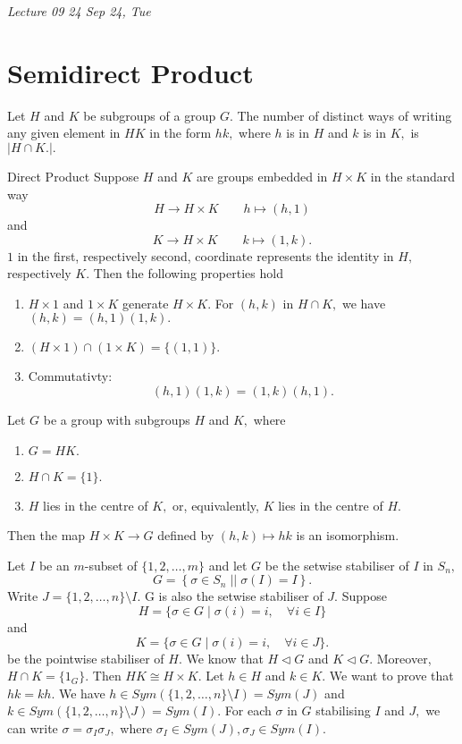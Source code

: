 \noindent
\emph{Lecture 09 \hfill 24 Sep 24, Tue}
\section{Semidirect Product}

\begin{proposition}\label{prop:number-of-representations}
	Let $H$ and $K$ be subgroups of a group $G.$ The number of distinct ways of
	writing any given element in $HK$ in the form $hk,$ where $h$ is in $H$ and $k$ 
	is in $K,$ is $ \lvert H \cap K. \rvert.$
\end{proposition}

Direct Product
Suppose $H$ and $K$ are groups embedded in $H \times K$ in the standard way
$$ H \to H \times  K \qquad h \mapsto (h,1) $$
and 
$$ K \to H \times  K \qquad k \mapsto (1,k) .$$
$1$ in the first, respectively second, coordinate represents the identity in $H,$
respectively $K.$
Then the following properties hold
\begin{enumerate}
	\item $H \times  1$ and $1 \times  K$ generate $ H \times  K.$
		For $(h, k )$ in $ H \cap K,$ we have $(h,k) = (h, 1) (1, k).$
	\item $ ( H \times 1) \cap (1 \times  K) = \{ ( 1, 1 ) \}.$
	\item Commutativty:
		$$(h,1) ( 1,k) = (1,k) (h,1).$$
\end{enumerate}

\begin{theorem}
	Let $G$ be a group with subgroups $H$ and $K,$ where
	\begin{enumerate}
		\item $G = H K.$
		\item $H \cap K = \{ 1 \}.$
		\item $H$ lies in the centre of $K,$ or, equivalently,
			$K$ lies in the centre of $H.$
	\end{enumerate}
	Then the map $ H \times K \to G$ defined by $(h, k) \mapsto hk$
	is an isomorphism.
\end{theorem}

\begin{example}
	Let $I$ be an $m$\nobreakdash-subset of $\{ 1, 2, \dotsc, m \}$ and
	let $G$ be the setwise stabiliser of $I$ in $S_n,$
	$$ G = \left\{ \sigma \in S_n \; \mid\vert \; \sigma(I) = I \right\} .$$
	Write $J = \{ 1, 2, \dotsc, n  \} \setminus I.$ G is also the setwise 
	stabiliser of $J.$ Suppose 
	$$ H = \{ \sigma \in G \; \vert \; \sigma(i) = i, \quad \forall i \in I \} $$
	and
	$$ K = \{ \sigma \in G \; \vert \; \sigma(i) = i , \quad \forall i \in J \} .$$
	be the pointwise stabiliser of $H.$ We know that $H \triangleleft G$ and 
	$K \triangleleft G.$ Moreover, $H \cap K = \{ 1_G \}.$ Then $HK \cong H \times  K.$
	Let $h \in H$ and $k \in K.$ We want to prove that $hk = kh.$
	We have $ h \in Sym( \{ 1, 2, \dotsc, n \} \setminus I ) = Sym(J)$
	and $k \in Sym( \{ 1, 2, \dotsc, n \} \setminus J) = Sym(I).$
	For each $\sigma$ in $G$ stabilising $I$ and $J,$ we can write
	$\sigma = \sigma_I \sigma_J,$ where $\sigma_I \in Sym(J), \sigma_J \in Sym(I).$
\end{example}


